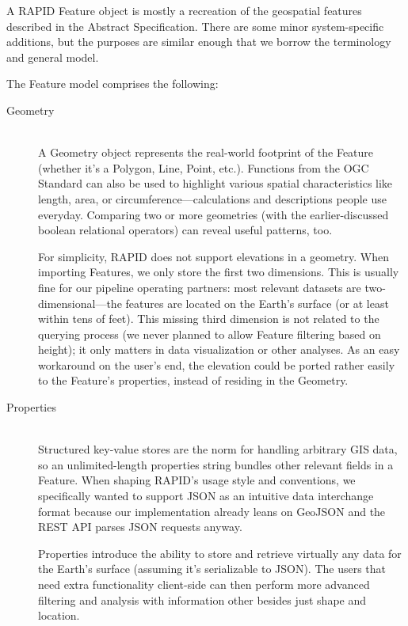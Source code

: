 A RAPID Feature object is mostly a recreation of the geospatial features described in the Abstract Specification. There are some minor system-specific additions, but the purposes are similar enough that we borrow the terminology and general model.

The Feature model comprises the following:

\begin{description}
  \item[Geometry] \hfill \\
  A Geometry object represents the real-world footprint of the Feature (whether it's a Polygon, Line, Point, etc.). Functions from the OGC Standard can also be used to highlight various spatial characteristics like length, area, or circumference---calculations and descriptions people use everyday. Comparing two or more geometries (with the earlier-discussed boolean relational operators) can reveal useful patterns, too.
   
   For simplicity, RAPID does not support elevations in a geometry. When importing Features, we only store the first two dimensions. This is usually fine for our pipeline operating partners: most relevant datasets are two-dimensional---the features are located on the Earth's surface (or at least within tens of feet). This missing third dimension is not related to the querying process (we never planned to allow Feature filtering based on height); it only matters in data visualization or other analyses. As an easy workaround on the user's end, the elevation could be ported rather easily to the Feature's properties, instead of residing in the Geometry.
  
  \item[Properties] \hfill \\
  Structured key-value stores are the norm for handling arbitrary GIS data, so an unlimited-length properties string bundles other relevant fields in a Feature. When shaping RAPID's usage style and conventions, we specifically wanted to support JSON as an intuitive data interchange format because our implementation already leans on GeoJSON and the REST API parses JSON requests anyway.
  
  Properties introduce the ability to store and retrieve virtually any data for the Earth's surface (assuming it's serializable to JSON). The users that need extra functionality client-side can then perform more advanced filtering and analysis with information other besides just shape and location.
  

\end{description}

